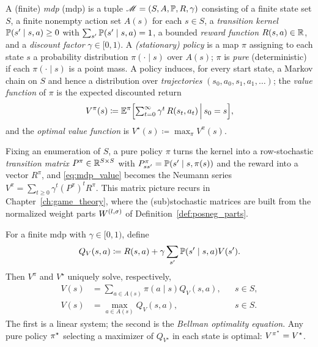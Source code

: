 \begin{definition}\label{def:mdp}
A (finite) \emph{\acl{mdp}} (\acs{mdp}) \parencite{Puterman1994mdp,SuttonBarto2018rl} is a tuple $\mathcal{M} = (S, A, \P, R, \gamma)$ consisting of a finite state set $S$, a finite nonempty action set $A(s)$ for each $s \in S$, a \emph{transition kernel} $\P(s' \mid s, a) \ge 0$ with $\sum_{s'} \P(s' \mid s, a) = 1$, a bounded \emph{reward function} $R(s, a) \in \RR$, and a \emph{discount factor} $\gamma \in [0, 1)$. A \emph{(stationary) policy} is a map $\pi$ assigning to each state $s$ a probability distribution $\pi(\cdot \mid s)$ over $A(s)$; $\pi$ is \emph{pure} (deterministic) if each $\pi(\cdot \mid s)$ is a point mass. A policy induces, for every start state, a Markov chain on $S$ and hence a distribution over \emph{trajectories} $(s_0, a_0, s_1, a_1, \ldots)$; the \emph{value function} of $\pi$ is the expected discounted return
\begin{equation}
	V^{\pi}(s) \coloneqq \E^{\pi}\Bigl[ \textstyle\sum_{t=0}^{\infty} \gamma^{t}\, R(s_t, a_t) \,\Big|\, s_0 = s \Bigr],
	\label{eq:mdp_value}
\end{equation}
and the \emph{optimal value function} is $V^{\star}(s) \coloneqq \max_{\pi} V^{\pi}(s)$.
\end{definition}

Fixing an enumeration of $S$, a pure policy $\pi$ turns the kernel into a row-stochastic \emph{transition matrix} $P^{\pi} \in \RR^{S \times S}$ with $P^{\pi}_{s s'} = \P(s' \mid s, \pi(s))$ and the reward into a vector $R^{\pi}$, and \eqref{eq:mdp_value} becomes the Neumann series $V^{\pi} = \sum_{t \ge 0} \gamma^t (P^{\pi})^t R^{\pi}$. This matrix picture recurs in Chapter~\ref{ch:game_theory}, where the (sub)stochastic matrices are built from the normalized weight parts $\Wsig{l}{\sigma}$ of Definition~\ref{def:posneg_parts}.

\begin{proposition}\label{prop:bellman}
For a finite \ac{mdp} with $\gamma\in[0,1)$, define
\[
Q_V(s,a)\coloneqq R(s,a)+\gamma\sum_{s'}\P(s'\mid s,a)V(s').
\]
Then $V^{\pi}$ and $V^{\star}$ uniquely solve, respectively,
\begin{align}
V(s)&=\sum_{a\in A(s)}\pi(a\mid s)Q_V(s,a), &&s\in S, \label{eq:bellman_evaluation}\\
V(s)&=\max_{a\in A(s)}Q_V(s,a), &&s\in S. \label{eq:bellman_optimality}
\end{align}
The first is a linear system; the second is the \emph{Bellman optimality equation}. Any pure policy $\polstar$ selecting a maximizer of $Q_{V^{\star}}$ in each state is optimal: $V^{\polstar}=V^{\star}$.
\end{proposition}

